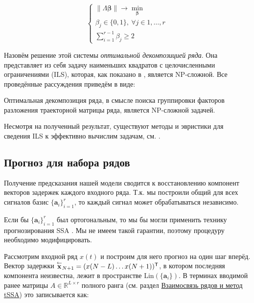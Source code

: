 	\begin{equation}\label{eq:decomp_search_final}
		\begin{cases*}
			\lVert \Lambda \boldsymbol{\beta} \rVert \to \underset{\boldsymbol{\beta}}{\min} \\
			\beta_j \in \{0, 1\}, \ \forall j \in 1, \ldots, r \\
			\sum\limits_{i = 1}^{r - 1} \beta_j \ge 2
		\end{cases*}
	\end{equation}
	
	Назовём решение этой системы \emph{оптимальной декомпозицией ряда}. Она представляет из себя задачу наименьших квадратов с целочисленными ограничениями (ILS), которая, как показано в \cite{van1981another}, является NP-сложной. Все проведённые рассуждения приведём в виде:
	
	\begin{Th}
		Оптимальная декомпозиция ряда, в смысле поиска группировки факторов разложения траекторной матрицы ряда, является NP-сложной задачей.
	\end{Th}
	
	Несмотря на полученный результат, существуют методы и эвристики для сведения ILS к эффективно вычислим задачам, см. \cite{Grafarend2022}.
	
	
	\subsection*{Прогноз для набора рядов}\label{sec:tssa_forecast}
	
	Получение предсказания нашей модели сводится к восстановлению компонент векторов задержек каждого входного ряда. Т.к. мы построили общий для всех сигналов базис $ \{\mathbf{a}_i\}_{i = 1}^r $, то каждый сигнал может обрабатываться независимо.
	
	Если бы $ \{\mathbf{a}_i\}_{i = 1}^r $ был ортогональным, то мы бы могли применить технику прогнозирования SSA \cite{ecfb9dc578be43ae9ee8fc88b8ff9151}. Мы не имеем такой гарантии, поэтому процедуру необходимо модифицировать.
	
	Рассмотрим входной ряд $ x(t) $ и построим для него прогноз на один шаг вперёд. Вектор задержки $ \overset{\leftarrow}{\mathbf{x}}_{N + 1} = (x(N - L) \ldots x(N + 1))^{\mathsf{T}} $, в котором последняя компонента неизвестна, лежит в пространстве $ \text{Lin}(\{\mathbf{a}_i\}) $. В терминах вводимой ранее матрицы $ A \in \mathbb{R}^{L \times r} $ полного ранга (см. раздел \hyperref[sec:tssa_method]{Взаимосвязь рядов и метод tSSA}) это записывается как:
	
